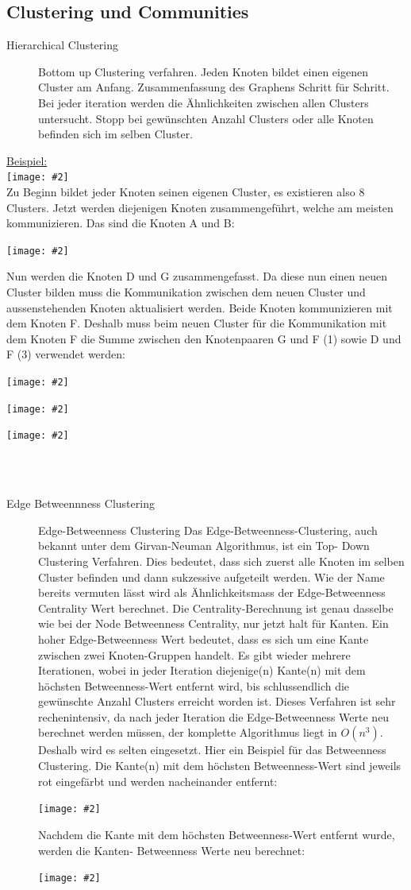 \documentclass[a4paper,landscape,12pt]{scrreprt}
\newenvironment{Figure}
  {\noindent\minipage{\linewidth}}
  {\endminipage}
\newcommand{\pic}[2][ ]{
\begin{Figure}
 \texttt{[image: \#2]}
 \captionof{figure}{#1}
\end{Figure}
}
\begin{document}
\begin{multicols*}{2}
\section{Clustering und Communities} %
\label{sec:clustering_und_communities}
\begin{description}
	\item[Hierarchical Clustering] Bottom up Clustering verfahren. Jeden Knoten bildet einen eigenen Cluster am Anfang. Zusammenfassung des Graphens Schritt für Schritt. Bei jeder iteration werden die Ähnlichkeiten zwischen allen Clusters untersucht. Stopp bei gewünschten Anzahl Clusters oder alle Knoten befinden sich im selben Cluster.
\end{description}
\underline{Beispiel:}\\
\pic{img/hcb.png}\\
Zu Beginn bildet jeder Knoten seinen eigenen Cluster, es existieren also 8 Clusters. Jetzt werden
diejenigen Knoten zusammengeführt, welche am meisten kommunizieren. Das sind die Knoten A und
B:
\pic{img/hcb1.png}
Nun werden die Knoten D und G zusammengefasst. Da diese nun einen neuen Cluster bilden muss die
Kommunikation zwischen dem neuen Cluster und aussenstehenden Knoten aktualisiert werden. Beide
Knoten kommunizieren mit dem Knoten F. Deshalb muss beim neuen Cluster für die Kommunikation
mit dem Knoten F die Summe zwischen den Knotenpaaren G und F (1) sowie D und F (3) verwendet
werden:
\pic{img/hcb2.png}
\pic{img/hcb3.png}
\pic{img/hcb4.png}
\\
\\
\begin{description}
	\item[Edge Betweennness Clustering]Edge-Betweenness Clustering
Das Edge-Betweenness-Clustering, auch bekannt unter dem Girvan-Neuman Algorithmus, ist ein Top-
Down Clustering Verfahren. Dies bedeutet, dass sich zuerst alle Knoten im selben Cluster befinden und
dann sukzessive aufgeteilt werden.
Wie der Name bereits vermuten lässt wird als Ähnlichkeitsmass der Edge-Betweenness Centrality Wert
berechnet. Die Centrality-Berechnung ist genau dasselbe wie bei der Node Betweenness Centrality,
nur jetzt halt für Kanten. Ein hoher Edge-Betweenness Wert bedeutet, dass es sich um eine Kante
zwischen zwei Knoten-Gruppen handelt. Es gibt wieder mehrere Iterationen, wobei in jeder Iteration
diejenige(n) Kante(n) mit dem höchsten Betweenness-Wert entfernt wird, bis schlussendlich die
gewünschte Anzahl Clusters erreicht worden ist. Dieses Verfahren ist sehr rechenintensiv, da nach
jeder Iteration die Edge-Betweenness Werte neu berechnet werden müssen, der komplette
Algorithmus liegt in $O(n^3)$. Deshalb wird es selten eingesetzt.
Hier ein Beispiel für das Betweenness Clustering. Die Kante(n) mit dem höchsten Betweenness-Wert
sind jeweils rot eingefärbt und werden nacheinander entfernt:
 \pic{img/ebc1.png}
 Nachdem die Kante mit dem höchsten Betweenness-Wert entfernt wurde, werden die Kanten-
Betweenness Werte neu berechnet:
\pic{img/ebc2.png}
\end{description}

\end{multicols*}
\end{document}
